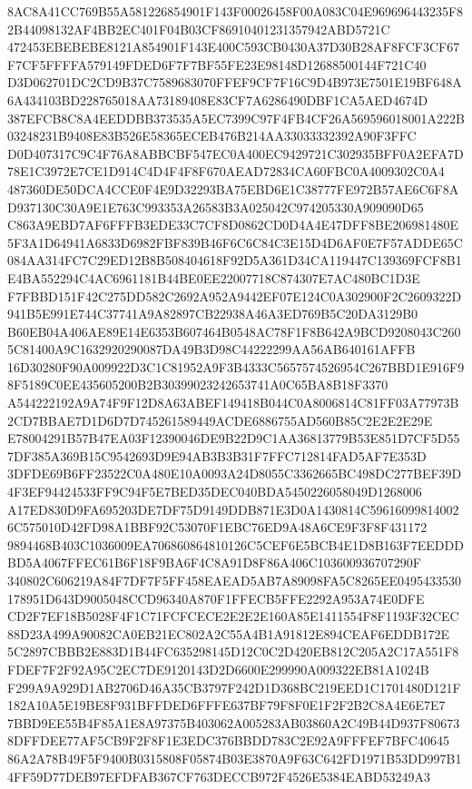 \documentclass[UTF8,fontset=fandol,zihao=-4,a4paper]{ctexart}
\begin{document}
{{8AC8A41CC769B55A581226854901F143F00026458F00A083C04E969696443235F82B44098132AF4BB2EC401F04B03CF86910401231357942ABD5721C
472453EBEBEBE8121A854901F143E400C593CB0430A37D30B28AF8FCF3CF67F7CF5FFFFA579149FDED6F7F7BF55FE23E98148D12688500144F721C40
D3D062701DC2CD9B37C7589683070FFEF9CF7F16C9D4B973E7501E19BF648A6A434103BD228765018AA73189408E83CF7A6286490DBF1CA5AED4674D
387EFCB8C8A4EEDDBB373535A5EC7399C97F4FB4CF26A569596018001A222B03248231B9408E83B526E58365ECEB476B214AA33033332392A90F3FFC
D0D407317C9C4F76A8ABBCBF547EC0A400EC9429721C302935BFF0A2EFA7D78E1C3972E7CE1D914C4D4F4F8F670AEAD72834CA60FBC0A4009302C0A4
487360DE50DCA4CCE0F4E9D32293BA75EBD6E1C38777FE972B57AE6C6F8AD937130C30A9E1E763C993353A26583B3A025042C974205330A909090D65
C863A9EBD7AF6FFFB3EDE33C7CF8D0862CD0D4A4E47DFF8BE206981480E5F3A1D64941A6833D6982FBF839B46F6C6C84C3E15D4D6AF0E7F57ADDE65C
084AA314FC7C29ED12B8B508404618F92D5A361D34CA119447C139369FCF8B1E4BA552294C4AC6961181B44BE0EE22007718C874307E7AC480BC1D3E
F7FBBD151F42C275DD582C2692A952A9442EF07E124C0A302900F2C2609322D941B5E991E744C37741A9A82897CB22938A46A3ED769B5C20DA3129B0
B60EB04A406AE89E14E6353B607464B0548AC78F1F8B642A9BCD9208043C2605C81400A9C1632920290087DA49B3D98C44222299AA56AB640161AFFB
16D30280F90A009922D3C1C81952A9F3B4333C5657574526954C267BBD1E916F98F5189C0EE435605200B2B30399023242653741A0C65BA8B18F3370
A544222192A9A74F9F12D8A63ABEF149418B044C0A8006814C81FF03A77973B2CD7BBAE7D1D6D7D745261589449ACDE6886755AD560B85C2E2E2E29E
E78004291B57B47EA03F12390046DE9B22D9C1AA36813779B53E851D7CF5D557DF385A369B15C9542693D9E94AB3B3B31F7FFC712814FAD5AF7E353D
3DFDE69B6FF23522C0A480E10A0093A24D8055C3362665BC498DC277BEF39D4F3EF94424533FF9C94F5E7BED35DEC040BDA5450226058049D1268006
A17ED830D9FA695203DE7DF75D9149DDB871E3D0A1430814C596160998140026C575010D42FD98A1BBF92C53070F1EBC76ED9A48A6CE9F3F8F431172
9894468B403C1036009EA706860864810126C5CEF6E5BCB4E1D8B163F7EEDDDBD5A4067FFEC61B6F18F9BA6F4C8A91D8F86A406C103600936707290F
340802C606219A84F7DF7F5FF458EAEAD5AB7A89098FA5C8265EE0495433530178951D643D9005048CCD96340A870F1FFECB5FFE2292A953A74E0DFE
CD2F7EF18B5028F4F1C71FCFCECE2E2E2E160A85E1411554F8F1193F32CEC88D23A499A90082CA0EB21EC802A2C55A4B1A91812E894CEAF6EDDB172E
5C2897CBBB2E883D1B44FC635298145D12C0C2D420EB812C205A2C17A551F8FDEF7F2F92A95C2EC7DE9120143D2D6600E299990A009322EB81A1024B
F299A9A929D1AB2706D46A35CB3797F242D1D368BC219EED1C1701480D121F182A10A5E19BE8F931BFFDED6FFFE637BF79F8F0E1F2F2B2C8A4E6E7E7
7BBD9EE55B4F85A1E8A97375B403062A005283AB03860A2C49B44D937F806738DFFDEE77AF5CB9F2F8F1E3EDC376BBDD783C2E92A9FFFEF7BFC40645
86A2A78B49F5F9400B0315808F05874B03E3870A9F63C642FD1971B53DD997B14FF59D77DEB97EFDFAB367CF763DECCB972F4526E5384EABD53249A3
}}
\end{document}
